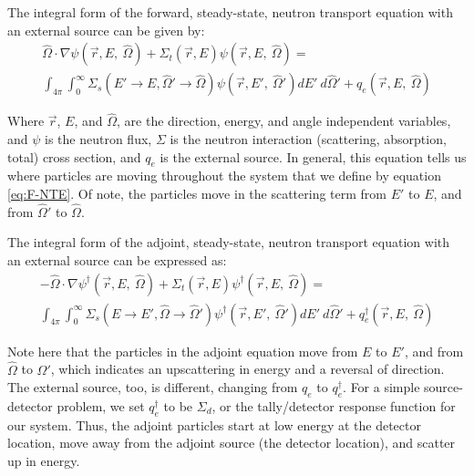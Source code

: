 The integral form of the forward, steady-state, neutron transport equation with
an external source can be given by:
\begin{multline}
\hat\Omega \cdot \nabla \psi
        (\vec {r} ,E,\:\hat\Omega)+\Sigma _{ t }
        (\vec{r},E)\psi (\vec { r } ,E,\:\hat\Omega) = \\
        \int _{ 4\pi  } \int _{ 0 }^{ \infty  } \Sigma _{ s }(E'\rightarrow E,
        \hat\Omega'\rightarrow\hat\Omega)\psi (\vec { r } ,E',\: \hat\Omega')dE'
        \:d\hat\Omega' + q_{e}(\vec { r } ,E, \:\hat\Omega)
\label{eq:F-NTE}
\end{multline}

Where $\vec { r }$, $E$, and $\hat\Omega$, are the direction, energy, and angle
independent variables, and $\psi$ is the neutron flux, $\Sigma$ is the neutron
interaction (scattering, absorption, total) cross section, and $q_{e}$ is the
external source. In general, this equation tells us where particles are moving
throughout the system that we define by equation \ref{eq:F-NTE}. Of note, the
particles move in the scattering term from $E'$ to $E$, and from $\hat\Omega'$
to $\hat\Omega$.

The integral form of the adjoint, steady-state, neutron transport equation with
an external source can be expressed as:
\begin{multline}
-\hat\Omega \cdot \nabla \psi^{\dagger}
        (\vec {r} ,E,\:\hat\Omega)+\Sigma _{ t }
        (\vec{r},E)\psi^{\dagger}  (\vec { r } ,E,\:\hat\Omega)
       = \\
        \int _{ 4\pi  } \int _{ 0 }^{ \infty  } \Sigma _{ s }(E\rightarrow E',
        \hat\Omega\rightarrow\hat\Omega')\psi^{\dagger}  (\vec { r } ,E',\:
        \hat\Omega')dE' \:d\hat\Omega' + q_{e}^\dagger(\vec { r } ,E, \:\hat\Omega)
\label{eq:A-NTE}
\end{multline}


Note here that the particles in the adjoint equation move from $E$ to $E'$, and
from $\hat\Omega$ to $\hat\Omega'$, which indicates an upscattering in energy
and a reversal of direction. The external source, too, is different, changing
from $q_{e}$ to $q_{e}^\dagger$. For a simple source-detector problem, we set
$q_{e}^\dagger$ to be $\Sigma _{ d }$, or the tally/detector response function
for our system. Thus, the adjoint particles start at low energy at the detector
location, move away from the adjoint source (the detector location), and scatter
up in energy.

